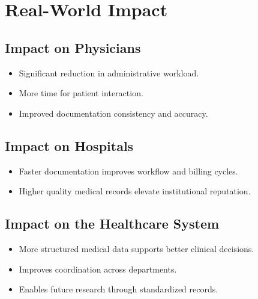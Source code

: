 \section{Real-World Impact}
\label{sec:conclusion:impact}
\subsection*{Impact on Physicians}
\begin{itemize}
    \item Significant reduction in administrative workload.
    \item More time for patient interaction.
    \item Improved documentation consistency and accuracy.
\end{itemize}

\subsection*{Impact on Hospitals}
\begin{itemize}
    \item Faster documentation improves workflow and billing cycles.
    \item Higher quality medical records elevate institutional reputation.
\end{itemize}

\subsection*{Impact on the Healthcare System}
\begin{itemize}
    \item More structured medical data supports better clinical decisions.
    \item Improves coordination across departments.
    \item Enables future research through standardized records.
\end{itemize}
